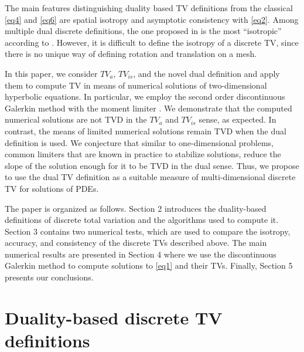 \documentclass[reqno,a4paper,12pt]{amsart}
\begin{document}
The main features distinguishing duality based TV definitions from the classical \eqref{eq4} and \eqref{eq6} are spatial isotropy and asymptotic consistency with \eqref{eq2}. Among multiple dual discrete definitions, the one proposed in \cite{Condat} is the most ``isotropic'' according to \cite{ChambolleBook}. However, it is difficult to define the isotropy of a discrete TV, since there is no unique way of defining rotation and translation on a mesh. 

In this paper, we consider $TV_a$, $TV_{is}$, and the novel dual definition and apply them to compute TV in means of numerical solutions of two-dimensional hyperbolic equations. In particular, we employ the second order discontinuous Galerkin method with the moment limiter \cite{Krivodonova2007}. We demonstrate that the computed numerical solutions are not TVD in the $TV_a$ and $TV_{is}$ sense, as expected. In contrast, the means of limited numerical solutions remain TVD when the dual definition is used. We conjecture that similar to one-dimensional problems, common limiters that are known in practice to stabilize solutions, reduce the slope of the solution enough for it to be TVD in the dual sense. Thus, we propose to use the dual TV definition as a suitable measure of multi-dimensional discrete TV for solutions of PDEs.

The paper is organized as follows. Section 2 introduces the duality-based definitions of  discrete total variation and the algorithms used to compute it. Section 3 contains two numerical tests, which are used to compare the isotropy, accuracy, and consistency of the discrete TVs described above. The main numerical results are presented in Section 4 where we use the discontinuous Galerkin method to compute solutions to \eqref{eq1} and their TVs. Finally, Section 5 presents our conclusions. 

\section{Duality-based discrete TV definitions}\label{se:definition}
\end{document}
